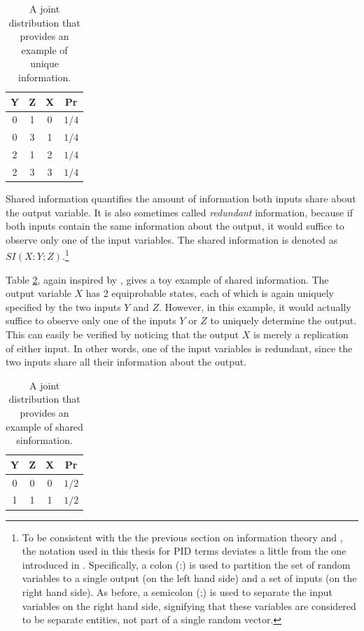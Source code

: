 \documentclass[12pt]{article}
\begin{document}
\begin{table}[h!]
\centering
\caption{A joint distribution that provides an example of unique information.}
\begin{tabular}{|c c |c|c|}
	\hline
	Y & Z & X & Pr\\ 
	\hline
	0 & 1 & 0 & $1/4$ \\
	0 & 3 & 1 & $1/4$ \\
	2 & 1 & 2 & $1/4$ \\
	2 & 3 & 3 & $1/4$ \\
	\hline
\end{tabular}
\label{table:1}
\end{table}

Shared information quantifies the amount of information both inputs share about the output variable. It is also sometimes called \textit{redundant} information, because if both inputs contain the same information about the output, it would suffice to observe only one of the input variables. The shared information is denoted as $SI(X:Y;Z)$.\footnote{To be consistent with the the previous section on information theory and \cite{cover-thomas}, the notation used in this thesis for PID terms deviates a little from the one introduced in \cite{bertschinger}. Specifically, a colon (:) is used to partition the set of random variables to a single output (on the left hand side) and a set of inputs (on the right hand side). As before, a semicolon (;) is used to separate the input variables on the right hand side, signifying that these variables are considered to be separate entities, not part of a single random vector.}

Table \ref{table:2}, again inspired by \cite{pid-synergy}, gives a toy example of shared information. The output variable $X$ has 2 equiprobable states, each of which is again uniquely specified by the two inputs $Y$ and $Z$. However, in this example, it would actually suffice to observe only one of the inputs $Y$ or $Z$ to uniquely determine the output. This can easily be verified by noticing that the output $X$ is merely a replication of either input. In other words, one of the input variables is redundant, since the two inputs share all their information about the output.

\begin{table}[h!]
\centering
\caption{A joint distribution that provides an example of shared sinformation.}
\begin{tabular}{|c c |c|c|}
	\hline
	Y & Z & X & Pr\\ 
	\hline
	0 & 0 & 0 & $1/2$\\
	1 & 1 & 1 & $1/2$\\ 
	\hline
\end{tabular}
\label{table:2}
\end{table}
\end{document}
